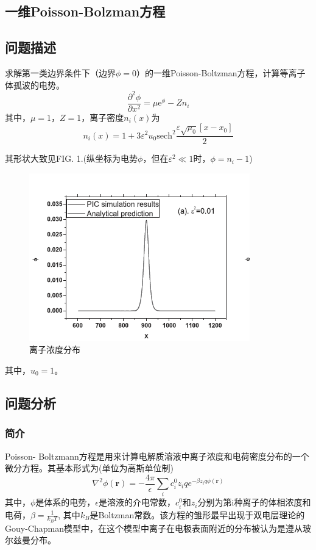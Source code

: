 \documentclass[twoside,twocolumn]{article}
\begin{document}
\begin{CJK*}{UTF8}{gkai}

\section{一维Poisson-Bolzman方程}
\subsection{问题描述}
求解第一类边界条件下（边界$\phi=0$）的一维Poisson-Boltzman方程，计算等离子体孤波的电势。
\begin{equation*}
	\frac{\partial^{2}\phi}{\partial x^{2}}=\mu \mathrm{e}^{\phi}-Zn_{i}
\end{equation*}
其中，$\mu=1$，$Z=1$，离子密度$n_{i}(x)$为
\begin{equation*}
	n_{i}(x)=1+3\varepsilon^{2}u_{0} \mathrm{sech}^{2}\frac{\varepsilon\sqrt{\mu_{0}}[x-x_{0}]}{2}
\end{equation*}

其形状大致见FIG. 1.(纵坐标为电势$\phi$，但在$\varepsilon^{2}\ll 1$时，$\phi=n_{i}-1$)

\begin{figure}[h]
	\centering
	\includegraphics[width=0.7\linewidth]{./figure/figure1.png}
	\caption{离子浓度分布}
	\label{fig:figure1}
\end{figure}
其中，$u_{0}=1$。
\subsection{问题分析}
\subsubsection{简介}
Poisson- Boltzmann方程是用来计算电解质溶液中离子浓度和电荷密度分布的一个微分方程。其基本形式为(单位为高斯单位制)
\begin{equation*}
\displaystyle \nabla ^{2}\phi ({\textbf {r}})=-{\frac {4\pi }{\epsilon }}\sum _{i}c_{i}^{0}z_{i}qe^{-\beta z_{i}q\phi ({\textbf {r}})}
\end{equation*}
其中，$\phi$是体系的电势，$\epsilon$是溶液的介电常数，$c_{i}^{0}$和$z_{i}$分别为第i种离子的体相浓度和电荷，$\beta =\frac{1}{k_{B}T}$, 其中$k_{B}$是Boltzman常数。该方程的雏形最早出现于双电层理论的Gouy-Chapman模型中，在这个模型中离子在电极表面附近的分布被认为是遵从玻尔兹曼分布。


\end{CJK*}
\end{document}
